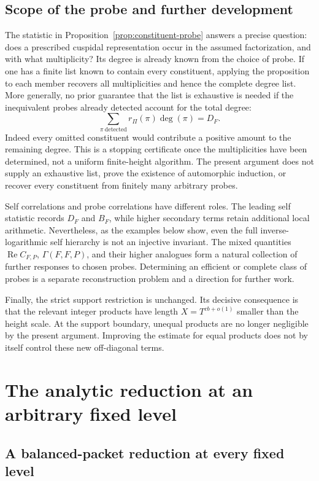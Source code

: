 \documentclass[11pt]{article}
\numberwithin{equation}{section}
\theoremstyle{remark}
\newcommand{\Rea}{\operatorname{Re}}
\begin{document}
\subsection{Scope of the probe and further development}

The statistic in Proposition~\ref{prop:constituent-probe} answers a
precise question: does a prescribed cuspidal representation occur in
the assumed factorization, and with what multiplicity?  Its degree is
already known from the choice of probe.  If one has a finite list known
to contain every constituent, applying the proposition to each member
recovers all multiplicities and hence the complete degree list.
More generally, no prior guarantee that the list is exhaustive is needed
if the inequivalent probes already detected account for the total degree:
\[
 \sum_{\pi\ \mathrm{detected}}r_\Pi(\pi)\deg(\pi)=D_F.
\]
Indeed every omitted constituent would contribute a positive amount to
the remaining degree. This is a stopping certificate once the
multiplicities have been determined, not a uniform finite-height
algorithm.
The present argument does not supply an exhaustive list, prove the
existence of automorphic induction, or recover every constituent from
finitely many arbitrary probes.

Self correlations and probe correlations have different roles.  The
leading self statistic records $D_F$ and $B_F$, while higher secondary
terms retain additional local arithmetic.  Nevertheless, as the
examples below show, even the full inverse-logarithmic self hierarchy
is not an injective invariant.  The mixed quantities
$\Rea C_{F,P}$, $\Gamma(F,F,P)$, and their higher analogues form a natural
collection of further responses to chosen probes.  Determining an
efficient or complete class of probes is a separate reconstruction
problem and a direction for further work.

Finally, the strict support restriction is unchanged.  Its decisive
consequence is that the relevant integer products have length
$X=T^{cb+o(1)}$ smaller than the height scale.  At the support boundary,
unequal products are no longer negligible by the present argument.
Improving the estimate for equal products does not by itself control
these new off-diagonal terms.

\section{The analytic reduction at an arbitrary fixed level}
\subsection{A balanced-packet reduction at every fixed level}
\label{n:analytic-reduction}
\end{document}
